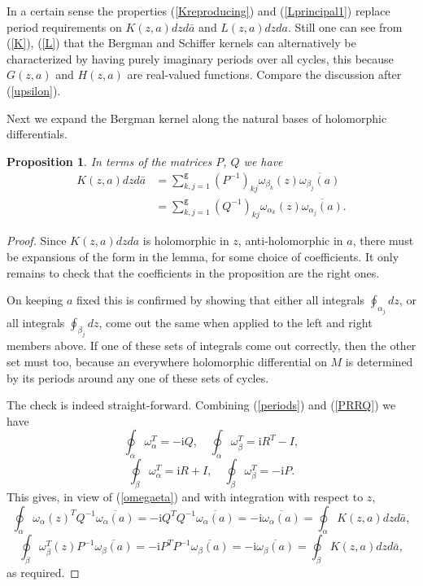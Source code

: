 \documentclass[reqno,12pt]{article}
\theoremstyle{plain}
\newtheorem{proposition}[thm]{Proposition}
\theoremstyle{definition}
\numberwithin{equation}{section}
\numberwithin{figure}{section}
\def\I{\mathrm{i}}
\begin{document}
In a certain sense the properties (\ref{Kreproducing}) and (\ref{Lprincipal1}) replace period requirements
on $K(z,a)dzd\bar{a}$ and $L(z,a)dzda$. Still one can see from (\ref{K}), (\ref{L}) that
the Bergman and Schiffer kernels can alternatively be characterized by having purely imaginary periods over all cycles,
this because $G(z,a)$ and $H(z,a)$ are real-valued functions. Compare the discussion after (\ref{upsilon}).

Next we expand the Bergman kernel along the natural bases of holomorphic differentials.
\begin{proposition}\label{prop:GUU} 
In terms of the matrices $P$, $Q$ we have 
\begin{align}\label{KPQ} 
K(z,a)dzd\bar{a}
&=\sum_{k,j=1}^\texttt{g} (P^{-1})_{kj}\omega_{\beta_k}(z)\overline{\omega_{\beta_j}(a)}\\
&=\sum_{k,j=1}^\texttt{g} (Q^{-1})_{kj}\omega_{\alpha_k}(z)\overline{\omega_{\alpha_j}(a)}.
\end{align}
\end{proposition}

\begin{proof}
Since $K(z,a)dzda$ is holomorphic in $z$,
anti-holomorphic in $a$, there must be expansions of the form in the lemma, for some choice of coefficients.
It only remains to check that the coefficients in the proposition are the right ones. 

On keeping $a$ fixed this is confirmed by showing that either all integrals
$\oint_{\alpha_j}dz$, or all integrals $\oint_{\beta_j}dz$, 
come out the same when applied to the left and right members above. 
If one of these sets of integrals come out correctly, then the other set must too, because an everywhere holomorphic 
differential on $M$ is determined by its periods around any one of these sets of cycles.

The check is indeed straight-forward. Combining (\ref{periods}) and (\ref{PRRQ}) we have  
$$
\oint_\alpha \omega_{\alpha}^T =-\I Q, \quad \oint_\alpha \omega_\beta^T =\I R^T -I,
$$
$$
\oint_\beta \omega_\alpha^T =\I R+I, \quad \oint_\beta \omega_\beta^T =-\I P.
$$
This gives, in view of (\ref{omegaeta}) and with integration with respect to $z$, 
$$
\oint_{\alpha}\omega_\alpha(z)^T Q^{-1}\overline{\omega_\alpha(a)} 
=-\I Q^T Q^{-1}\overline{\omega_\alpha(a)}=-\I\overline{\omega_\alpha(a)}  
= \oint_{\alpha}K(z,a)dzd\bar{a}, 
$$
$$ 
\oint_{\beta}\omega_{\beta}^T(z)P^{-1}\overline{\omega_\beta(a)} 
=-\I P^T P^{-1}\overline{\omega_\beta(a)}=-\I\overline{\omega_\beta(a)}  
=\oint_{\beta}K(z,a)dzd\bar{a},
$$ 
as required.
\end{proof}
 
\end{document}
